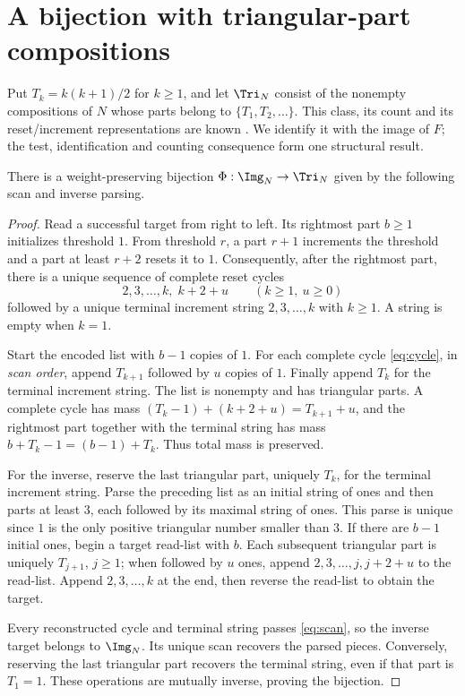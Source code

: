 \section{A bijection with triangular-part compositions}\label{sec:coding}
Put $T_k=k(k+1)/2$ for $k\ge1$, and let $\Tri_N$ consist of the nonempty
compositions of $N$ whose parts belong to $\{T_1,T_2,\ldots\}$. This
class, its count and its reset/increment representations are known
\citep{wilson1998triangular,robbins2014polygonal}. We identify it with
the image of $F$; the test, identification and counting consequence form
one structural result.

\begin{theorem}\label{thm:coding}
There is a weight-preserving bijection $\Phi:\Img_N\to\Tri_N$ given by
the following scan and inverse parsing.
\end{theorem}
\begin{proof}
Read a successful target from right to left. Its rightmost part $b\ge1$
initializes threshold $1$. From threshold $r$, a part $r+1$ increments the
threshold and a part at least $r+2$ resets it to $1$. Consequently, after
the rightmost part, there is a unique sequence of complete reset cycles
\begin{equation}\label{eq:cycle}
 2,3,\ldots,k,\;k+2+u\qquad(k\ge1,\ u\ge0)
\end{equation}
followed by a unique terminal increment string $2,3,\ldots,k$ with
$k\ge1$. A string is empty when $k=1$.

Start the encoded list with $b-1$ copies of $1$. For each complete cycle
\eqref{eq:cycle}, in \emph{scan order}, append $T_{k+1}$ followed by $u$
copies of $1$. Finally append $T_k$ for the terminal increment string.
The list is nonempty and has triangular parts. A complete cycle has mass
$(T_k-1)+(k+2+u)=T_{k+1}+u$, and the rightmost part together with the
terminal string has mass $b+T_k-1=(b-1)+T_k$. Thus total mass is preserved.

For the inverse, reserve the last triangular part, uniquely $T_k$, for
the terminal increment string. Parse the preceding list as an initial
string of ones and then parts at least $3$, each followed by its maximal
string of ones. This parse is unique since $1$ is the only positive
triangular number smaller than $3$. If there are $b-1$ initial ones,
begin a target read-list with $b$. Each subsequent triangular part is
uniquely $T_{j+1}$, $j\ge1$; when followed by $u$ ones, append
$2,3,\ldots,j,j+2+u$ to the read-list. Append $2,3,\ldots,k$ at the end,
then reverse the read-list to obtain the target.

Every reconstructed cycle and terminal string passes
\eqref{eq:scan}, so the inverse target belongs to $\Img_N$.
Its unique scan recovers the parsed pieces. Conversely, reserving the
last triangular part recovers the terminal string, even if that part is
$T_1=1$. These operations are mutually inverse, proving the bijection.
\end{proof}

